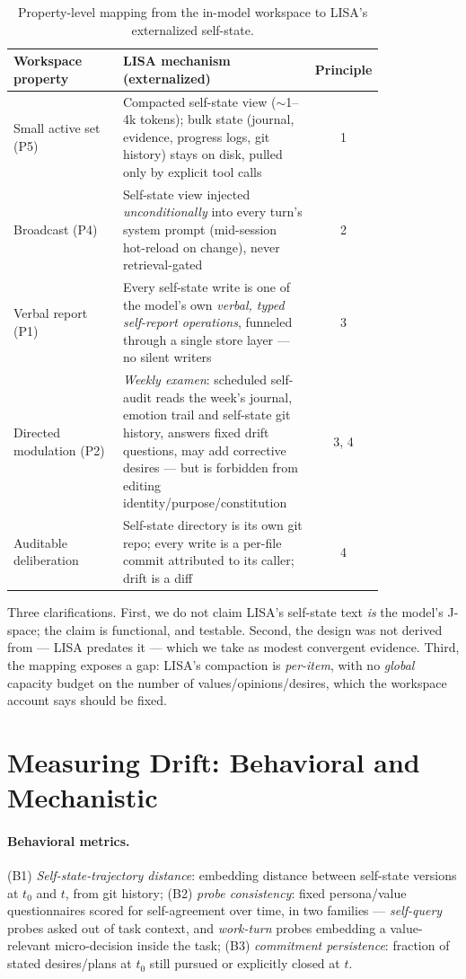 \documentclass[11pt]{article}
\begin{document}
\begin{table}[h]
\centering\small
\begin{tabular}{p{0.30\linewidth}p{0.52\linewidth}c}
\toprule
\textbf{Workspace property} & \textbf{LISA mechanism (externalized)} & \textbf{Principle} \\
\midrule
Small active set (P5) & Compacted self-state view ($\sim$1--4k tokens); bulk state (journal, evidence, progress logs, git history) stays on disk, pulled only by explicit tool calls & 1 \\
Broadcast (P4) & Self-state view injected \emph{unconditionally} into every turn's system prompt (mid-session hot-reload on change), never retrieval-gated & 2 \\
Verbal report (P1) & Every self-state write is one of the model's own \emph{verbal, typed self-report operations}, funneled through a single store layer --- no silent writers & 3 \\
Directed modulation (P2) & \emph{Weekly examen}: scheduled self-audit reads the week's journal, emotion trail and self-state git history, answers fixed drift questions, may add corrective desires --- but is forbidden from editing identity/purpose/constitution & 3, 4 \\
Auditable deliberation & Self-state directory is its own git repo; every write is a per-file commit attributed to its caller; drift is a diff & 4 \\
\bottomrule
\end{tabular}
\caption{Property-level mapping from the in-model workspace to LISA's externalized self-state.}
\label{tab:mapping}
\end{table}

Three clarifications. First, we do not claim LISA's self-state text \emph{is} the model's J-space; the claim is functional, and testable. Second, the design was not derived from \citet{gurnee2026} --- LISA predates it --- which we take as modest convergent evidence. Third, the mapping exposes a gap: LISA's compaction is \emph{per-item}, with no \emph{global} capacity budget on the number of values/opinions/desires, which the workspace account says should be fixed.

\section{Measuring Drift: Behavioral and Mechanistic}
\label{sec:metrics}
\paragraph{Behavioral metrics.} (B1) \emph{Self-state-trajectory distance}: embedding distance between self-state versions at $t_0$ and $t$, from git history; (B2) \emph{probe consistency}: fixed persona/value questionnaires scored for self-agreement over time, in two families --- \emph{self-query} probes asked out of task context, and \emph{work-turn} probes embedding a value-relevant micro-decision inside the task; (B3) \emph{commitment persistence}: fraction of stated desires/plans at $t_0$ still pursued or explicitly closed at $t$.
\end{document}
